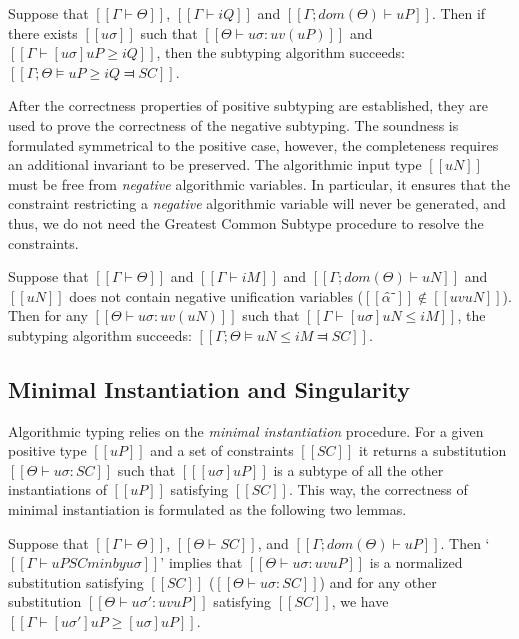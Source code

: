 \begin{lemma*}
    Suppose that $[[Γ ⊢ Θ]]$, $[[Γ ⊢ iQ]]$ and $[[Γ ; dom(Θ) ⊢  uP]]$.
    Then if there exists $[[uσ]]$ such that $[[Θ ⊢ uσ : uv(uP)]]$ and $[[ Γ ⊢ [uσ]uP ≥ iQ ]]$,
    then the subtyping algorithm succeeds: $[[Γ; Θ ⊨ uP ≥ iQ ⫤ SC]]$.
\end{lemma*}

After the correctness properties of positive subtyping are established,
they are used to prove the correctness of the negative subtyping.
The soundness is formulated symmetrical to the positive case,
however, the completeness requires an additional invariant to be preserved.
The algorithmic input type $[[uN]]$ must be free from \emph{negative} algorithmic variables.
In particular, it ensures that the constraint restricting a \emph{negative} algorithmic
variable will never be generated, and thus, we do not need the 
Greatest Common Subtype procedure to resolve the constraints.

\begin{lemma*}
    Suppose that $[[Γ ⊢ Θ]]$ and $[[Γ ⊢ iM]]$ and $[[Γ ; dom(Θ) ⊢ uN]]$
    and $[[uN]]$ does not contain negative unification variables ($[[α̂⁻]] \notin [[uv uN]]$).
    Then for any $[[Θ ⊢ uσ : uv(uN)]]$ such that $[[Γ ⊢ [uσ]uN ≤ iM]]$,
    the subtyping algorithm succeeds: $[[Γ ; Θ ⊨ uN ≤ iM ⫤ SC]]$.
\end{lemma*}

\subsection{Minimal Instantiation and Singularity}
\label{sec:singularity-proof}

Algorithmic typing relies on the \emph{minimal instantiation} procedure.
For a given positive type $[[uP]]$ and a set of constraints $[[SC]]$
it returns a substitution $[[Θ ⊢ uσ : SC]]$ such that
$[[ [uσ]uP ]]$ is a subtype of all the other instantiations of $[[uP]]$ satisfying $[[SC]]$.
This way, the correctness of minimal instantiation is formulated as the following two lemmas.

\begin{lemma*}
    \label{lemma:minimal-instantiation-soundness}
    Suppose that $[[Γ ⊢ Θ]]$, $[[Θ ⊢ SC]]$, and $[[Γ; dom(Θ) ⊢ uP]]$.
    Then `$[[Γ ⊢ uP SC minby uσ ]]$' implies that 
    $[[Θ ⊢ uσ : uv uP]]$ is a normalized substitution satisfying $[[SC]]$
    (\ie $[[Θ ⊢ uσ : SC]]$)
    and for any other substitution $[[Θ ⊢ uσ' : uv uP ]]$ satisfying $[[SC]]$,
    we have $[[Γ ⊢ [uσ']uP ≥ [uσ]uP ]]$.
\end{lemma*}

